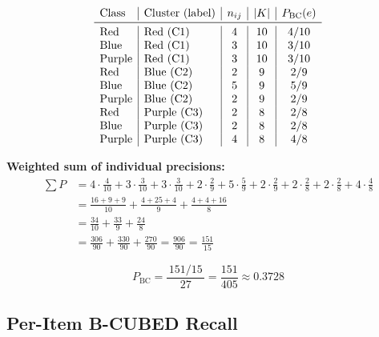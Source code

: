 \documentclass[11pt, a4paper]{article}
\begin{document}
\[
\begin{array}{l|l|c|c|c}
\text{Class} & \text{Cluster (label)} & n_{ij} & |K| & P_{\mathrm{BC}}(e) \\
\midrule
\text{Red}    & \text{Red (C1)}    & 4 & 10 & 4/10 \\
\text{Blue}   & \text{Red (C1)}    & 3 & 10 & 3/10 \\
\text{Purple} & \text{Red (C1)}    & 3 & 10 & 3/10 \\
\text{Red}    & \text{Blue (C2)}   & 2 &  9 & 2/9  \\
\text{Blue}   & \text{Blue (C2)}   & 5 &  9 & 5/9  \\
\text{Purple} & \text{Blue (C2)}   & 2 &  9 & 2/9  \\
\text{Red}    & \text{Purple (C3)} & 2 &  8 & 2/8  \\
\text{Blue}   & \text{Purple (C3)} & 2 &  8 & 2/8  \\
\text{Purple} & \text{Purple (C3)} & 4 &  8 & 4/8  \\
\end{array}
\]

\textbf{Weighted sum of individual precisions:}
\begin{align*}
  \textstyle\sum P
  &= 4{\cdot}\tfrac{4}{10}
   + 3{\cdot}\tfrac{3}{10}
   + 3{\cdot}\tfrac{3}{10}
   + 2{\cdot}\tfrac{2}{9}
   + 5{\cdot}\tfrac{5}{9}
   + 2{\cdot}\tfrac{2}{9}
   + 2{\cdot}\tfrac{2}{8}
   + 2{\cdot}\tfrac{2}{8}
   + 4{\cdot}\tfrac{4}{8} \\[4pt]
  &= \frac{16+9+9}{10} + \frac{4+25+4}{9} + \frac{4+4+16}{8} \\[4pt]
  &= \frac{34}{10} + \frac{33}{9} + \frac{24}{8} \\[4pt]
  &= \frac{306}{90} + \frac{330}{90} + \frac{270}{90}
   = \frac{906}{90}
   = \frac{151}{15}
\end{align*}

\begin{mathbox}
\[
  P_{\mathrm{BC}}
  = \frac{\,151/15\,}{27}
  = \frac{151}{405}
  \approx 0.3728
\]
\end{mathbox}

\subsection{Per-Item B-CUBED Recall}
\end{document}
